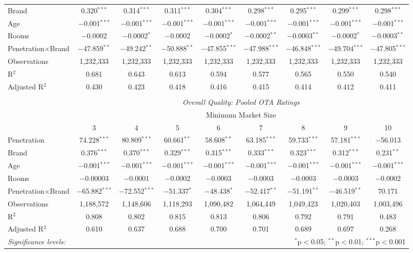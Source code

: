\begin{table}[!htbp]
\begin{sideways}
{\begin{tabular}{@{\extracolsep{5pt}}lcccccccc}
  Brand & 0.320$^{***}$ & 0.314$^{***}$ & 0.311$^{***}$ & 0.304$^{***}$ & 0.298$^{***}$ & 0.295$^{***}$ & 0.299$^{***}$ & 0.298$^{***}$ \\   
  Age & $-$0.001$^{***}$ & $-$0.001$^{***}$ & $-$0.001$^{***}$ & $-$0.001$^{***}$ & $-$0.001$^{***}$ & $-$0.001$^{***}$ & $-$0.001$^{***}$ & $-$0.001$^{***}$ \\ 
  Rooms & $-$0.0002 & $-$0.0002$^{*}$ & $-$0.0002 & $-$0.0002$^{*}$ & $-$0.0002$^{**}$ & $-$0.0003$^{**}$ & $-$0.0002$^{*}$ & $-$0.0003$^{**}$ \\  
  Penetration$\times$Brand & $-$47.859$^{**}$ & $-$49.242$^{**}$ & $-$50.888$^{**}$ & $-$47.855$^{***}$ & $-$47.988$^{***}$ & $-$46.848$^{***}$ & $-$49.704$^{***}$ & $-$47.805$^{***}$ \\
 \hline
Observations & 1,232,333 & 1,232,333 & 1,232,333 & 1,232,333 & 1,232,333 & 1,232,333 & 1,232,333 & 1,232,333 \\ 
R$^{2}$ & 0.681 & 0.643 & 0.613 & 0.594 & 0.577 & 0.565 & 0.550 & 0.540 \\ 
Adjusted R$^{2}$ & 0.430 & 0.423 & 0.418 & 0.416 & 0.415 & 0.414 & 0.412 & 0.411 \\ 
\hline 
\\[-1.8ex]
& \multicolumn{8}{c}{\textit{Overall Quality: Pooled OTA Ratings}} \\ 
\cline{2-9} 
& \multicolumn{8}{c}{Minimum Market Size} \\ 
 & 3 & 4 & 5 & 6 & 7 & 8 & 9 & 10\\ 
\hline  
 Penetration & 74.228$^{***}$ & 80.809$^{***}$ & 60.661$^{**}$ & 58.608$^{**}$ & 63.185$^{***}$ & 59.733$^{***}$ & 57.181$^{***}$ & $-$56.013 \\ 
  Brand & 0.376$^{***}$ & 0.370$^{***}$ & 0.329$^{***}$ & 0.315$^{***}$ & 0.333$^{***}$ & 0.323$^{***}$ & 0.312$^{***}$ & 0.231$^{**}$ \\ 
  Age & $-$0.001$^{***}$ & $-$0.001$^{***}$ & $-$0.001$^{***}$ & $-$0.001$^{***}$ & $-$0.001$^{***}$ & $-$0.001$^{***}$ & $-$0.001$^{***}$ & $-$0.001$^{***}$ \\ 
  Rooms & $-$0.00003 & $-$0.0001 & $-$0.0002 & $-$0.0003 & $-$0.0003 & $-$0.0003 & $-$0.0003 & $-$0.0002 \\ 
  Penetration$\times$Brand & $-$65.882$^{***}$ & $-$72.552$^{***}$ & $-$51.337$^{*}$ & $-$48.438$^{*}$ & $-$52.417$^{**}$ & $-$51.191$^{**}$ & $-$46.519$^{**}$ & 70.171 \\ 
 \hline
Observations & 1,188,572 & 1,148,606 & 1,118,293 & 1,090,482 & 1,064,449 & 1,049,423 & 1,020,403 & 1,003,496 \\ 
R$^{2}$ & 0.808 & 0.802 & 0.815 & 0.813 & 0.806 & 0.792 & 0.791 & 0.483 \\ 
Adjusted R$^{2}$ & 0.610 & 0.637 & 0.688 & 0.700 & 0.701 & 0.689 & 0.697 & 0.268 \\ 
\hline 

\textit{Significance levels:}  & \multicolumn{8}{r}{$^{*}$p$<$0.05; $^{**}$p$<$0.01; $^{***}$p$<$0.001} \\
\end{tabular} 
} \end{sideways}
\end{table} 
